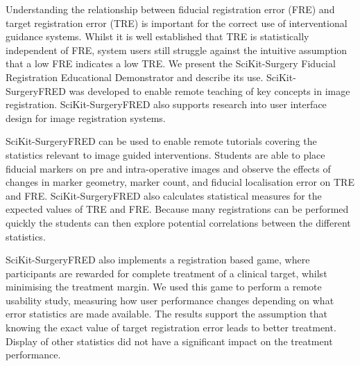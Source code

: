 Understanding the relationship between fiducial registration error (FRE) and target registration error (TRE) is important for the correct use of interventional guidance systems. Whilst it is well established that TRE is statistically independent of FRE, system users still struggle against the intuitive assumption that a low FRE indicates a low TRE. We present the SciKit-Surgery Fiducial Registration Educational Demonstrator and describe its use. SciKit-SurgeryFRED was developed to enable remote teaching of key concepts in image registration. SciKit-SurgeryFRED also supports research into user interface design for image registration systems. 

SciKit-SurgeryFRED can be used to enable remote tutorials covering the statistics relevant to image guided interventions. Students are able to place fiducial markers on pre and intra-operative images and observe the effects of changes in marker geometry, marker count, and fiducial localisation error on TRE and FRE. SciKit-SurgeryFRED also calculates statistical measures for the expected values of TRE and FRE. Because many registrations can be performed quickly the students can then explore potential correlations between the different statistics. 

SciKit-SurgeryFRED also implements a registration based game, where participants are rewarded for complete treatment of a clinical target, whilst minimising the treatment margin. We used this game to perform a remote usability study, measuring how user performance changes depending on what error statistics are made available. The results support the assumption that knowing the exact value of target registration error leads to better treatment. Display of other statistics did not have a significant impact on the treatment performance.  
